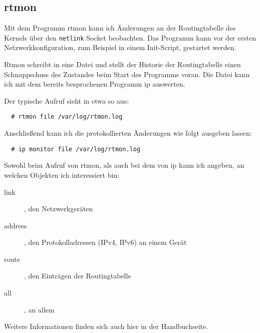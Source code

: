   \subsection*{rtmon}
  Mit dem Programm rtmon kann ich Änderungen an der Routingtabelle des Kernels
  über den \verb?netlink? Socket beobachten. Das Programm kann vor der ersten
  Netzwerkkonfiguration, zum Beispiel in einem Init-Script, gestartet werden.

  Rtmon schreibt in eine Datei und stellt der Historie der Routingtabelle
  einen Schnappschuss des Zustandes beim Start des Programms voran. Die Datei
  kann ich mit dem bereits besprochenen Programm ip auswerten.

  Der typische Aufruf sieht in etwa so aus:
  \begin{verbatim}
  # rtmon file /var/log/rtmon.log
  \end{verbatim}
  Anschließend kann ich die protokollierten Änderungen wie folgt ausgeben
  lassen:
  \begin{verbatim}
  # ip monitor file /var/log/rtmon.log
  \end{verbatim}

  Sowohl beim Aufruf von rtmon, als auch bei dem von ip kann ich angeben, an
  welchen Objekten ich interessiert bin:
  \begin{description}
    \item[link], den Netzwerkgeräten
    \item[address], den Protokolladressen (IPv4, IPv6) an einem Gerät
    \item[route], den Einträgen der Routingtabelle
    \item[all], an allem
  \end{description}

  Weitere Informationen finden sich auch hier in der Handbuchseite.
